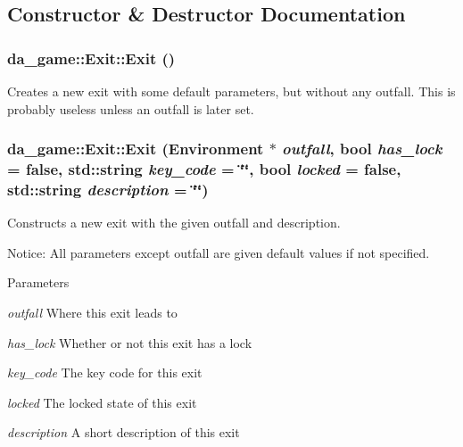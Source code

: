 \subsection{Constructor \& Destructor Documentation}
\hypertarget{classda__game_1_1Exit_aaacef438c545390f01c5bf1c6072d43e}{
\subsubsection[{Exit}]{\setlength{\rightskip}{0pt plus 5cm}da\_\-game::Exit::Exit ()}}
\label{classda__game_1_1Exit_aaacef438c545390f01c5bf1c6072d43e}
Creates a new exit with some default parameters, but without any outfall. This is probably useless unless an outfall is later set. \hypertarget{classda__game_1_1Exit_ae6a2d9ab456888b9c5aa7e23539b2827}{
\subsubsection[{Exit}]{\setlength{\rightskip}{0pt plus 5cm}da\_\-game::Exit::Exit ({\bf Environment} $\ast$ {\em outfall}, \/  bool {\em has\_\-lock} = {\ttfamily false}, \/  std::string {\em key\_\-code} = {\ttfamily \char`\"{}\char`\"{}}, \/  bool {\em locked} = {\ttfamily false}, \/  std::string {\em description} = {\ttfamily \char`\"{}\char`\"{}})}}
\label{classda__game_1_1Exit_ae6a2d9ab456888b9c5aa7e23539b2827}
Constructs a new exit with the given outfall and description.

Notice: All parameters except outfall are given default values if not specified.


\begin{DoxyParams}{Parameters}
\item[{\em outfall}]Where this exit leads to \item[{\em has\_\-lock}]Whether or not this exit has a lock \item[{\em key\_\-code}]The key code for this exit \item[{\em locked}]The locked state of this exit \item[{\em description}]A short description of this exit \end{DoxyParams}


